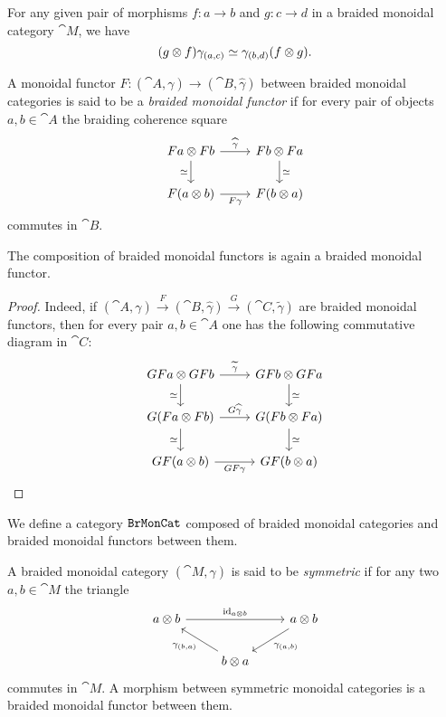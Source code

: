 \documentclass[../../deep-dive]{subfiles}
\begin{document}
\begin{corollary}
\label{cor:braiding-morphisms}
For any given pair of morphisms \(f: a \to b\) and \(g: c \to d\) in a braided
monoidal category \(\cat M\), we have
\[
(g \otimes f) \gamma_{(a, c)} \simeq \gamma_{(b, d)} (f \otimes g).
\]
\end{corollary}

\begin{definition}
\label{def:braided-monoidal-functor}
A monoidal functor \(F: (\cat A, \gamma) \to (\cat B, \widehat \gamma)\) between
braided monoidal categories is said to be a \emph{braided monoidal functor} if
for every pair of objects \(a, b \in \cat A\) the braiding coherence square
\[
\begin{tikzcd}
F a \otimes F b \ar[r, "\widehat\gamma"] \ar[d, "\dis"']
&F b \otimes F a \ar[d, "\dis"] \\
F (a \otimes b) \ar[r, "F \gamma"'] &F (b \otimes a)
\end{tikzcd}
\]
commutes in \(\cat B\).
\end{definition}

\begin{corollary}
\label{cor:composition-of-braided-monoidal-functors}
The composition of braided monoidal functors is again a braided monoidal
functor.
\end{corollary}

\begin{proof}
Indeed, if
\((\cat A, \gamma) \xrightarrow F (\cat B, \widehat \gamma) \xrightarrow G (\cat
C, \widetilde \gamma)\) are braided monoidal functors, then for every pair
\(a, b \in \cat A\) one has the following commutative diagram in \(\cat C\):
\[
\begin{tikzcd}
G F a \otimes G F b
\ar[r, "\widetilde \gamma"]
\ar[d, "\dis"']
&GF b \otimes GF a
\ar[d, "\dis"]
\\
G(F a \otimes F b)
\ar[r, "G \widehat \gamma"]
\ar[d, "\dis"']
&G (F b \otimes F a)
\ar[d, "\dis"]
\\
GF (a \otimes b)
\ar[r, "G F \gamma"']
&GF (b \otimes a)
\end{tikzcd}
\]
\end{proof}

\begin{definition}
\label{def:category-of-braided-monoidal}
We define a category \({\texttt{BrMonCat}}\) composed of braided monoidal categories and
braided monoidal functors between them.
\end{definition}

\begin{definition}
\label{def:symmetric-monoidal-category}
A braided monoidal category \((\cat M, \gamma)\) is said to be \emph{symmetric}
if for any two \(a, b \in \cat M\) the triangle
\[
\begin{tikzcd}
a \otimes b \ar[rr, "\Id_{a \otimes b}"]
& &a \otimes b \ar[ld, "\gamma_{(a, b)}"] \\
&b \otimes a \ar[lu, "\gamma_{(b, a)}"] &
\end{tikzcd}
\]
commutes in \(\cat M\). A morphism between symmetric monoidal categories is a
braided monoidal functor between them.
\end{definition}
\end{document}
